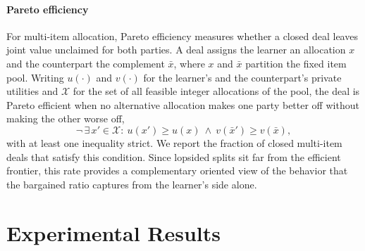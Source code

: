\documentclass{interact}
\theoremstyle{plain}
\theoremstyle{definition}
\theoremstyle{remark}
\begin{document}
\paragraph{Pareto efficiency} For multi-item allocation, Pareto efficiency measures whether a closed deal leaves joint value unclaimed for both parties. A deal assigns the learner an allocation $x$ and the counterpart the complement $\bar{x}$, where $x$ and $\bar{x}$ partition the fixed item pool. Writing $u(\cdot)$ and $v(\cdot)$ for the learner's and the counterpart's private utilities and $\mathcal{X}$ for the set of all feasible integer allocations of the pool, the deal is Pareto efficient when no alternative allocation makes one party better off without making the other worse off,
\begin{equation}
\neg\,\exists\, x' \in \mathcal{X}:\ u(x') \ge u(x)\ \wedge\ v(\bar{x}') \ge v(\bar{x}),
\label{eq:pareto}
\end{equation}
with at least one inequality strict. We report the fraction of closed multi-item deals that satisfy this condition. Since lopsided splits sit far from the efficient frontier, this rate provides a complementary oriented view of the behavior that the bargained ratio captures from the learner's side alone.

\section{Experimental Results}\label{sec:results}
\end{document}
